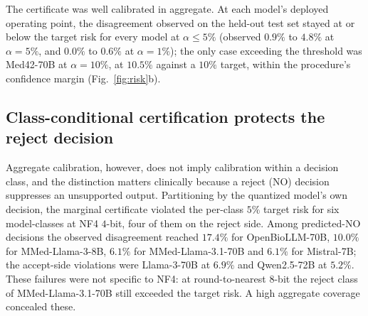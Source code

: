 \documentclass[pdflatex,sn-mathphys-num]{sn-jnl}%
\theoremstyle{thmstyleone}%
\theoremstyle{thmstyletwo}%
\theoremstyle{thmstylethree}%
\begin{document}
The certificate was well calibrated in aggregate. At each model's deployed operating point, the
disagreement observed on the held-out test set stayed at or below the target risk for every model
at $\alpha\le 5\%$ (observed $0.9\%$ to $4.8\%$ at $\alpha=5\%$, and $0.0\%$ to $0.6\%$ at
$\alpha=1\%$); the only case exceeding the threshold was Med42-70B at $\alpha=10\%$, at $10.5\%$ against a $10\%$
target, within the procedure's confidence margin (Fig.~\ref{fig:risk}b).
 
\subsection*{Class-conditional certification protects the reject decision}
 
Aggregate calibration, however, does not imply calibration within a decision class, and the
distinction matters clinically because a reject (NO) decision suppresses an unsupported output.
Partitioning by the quantized model's own decision, the marginal certificate violated the per-class
$5\%$ target risk for six model-classes at NF4 $4$-bit, four of them on the reject side. Among
predicted-NO decisions the observed disagreement reached $17.4\%$ for OpenBioLLM-70B, $10.0\%$ for
MMed-Llama-3-8B, $6.1\%$ for MMed-Llama-3.1-70B and $6.1\%$ for Mistral-7B; the accept-side violations
were Llama-3-70B at $6.9\%$ and Qwen2.5-72B at $5.2\%$. These failures were not specific to NF4:
at round-to-nearest $8$-bit the reject class of MMed-Llama-3.1-70B still exceeded the target risk. A high
aggregate coverage concealed these.
 
\end{document}
